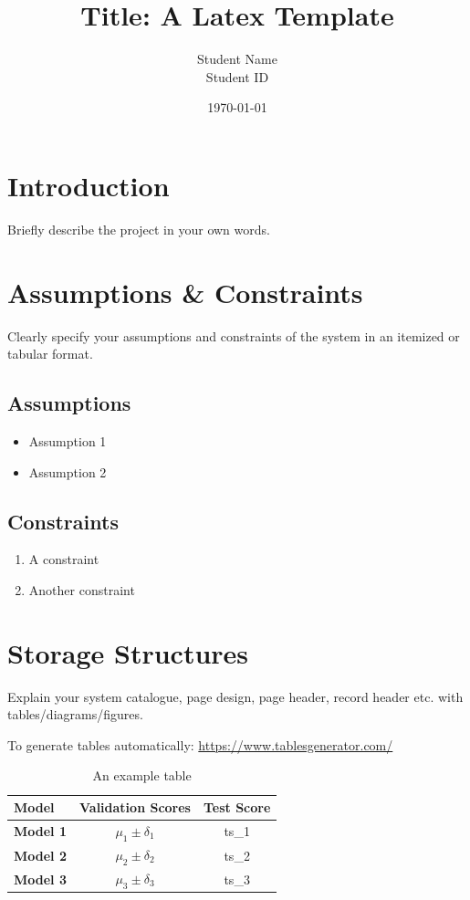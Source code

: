 \documentclass{article}
\title{Title: A Latex Template}
\date{\today}
\author{Student Name \\ Student ID}
\begin{document}
\maketitle
\newpage
\tableofcontents
\newpage
\section{Introduction}
\label{sec:introduction}
Briefly describe the project in your own words. 
\section{Assumptions \& Constraints}
\label{sec:ass-and-const}
Clearly specify your assumptions and constraints of the system in an itemized or tabular format. 
\subsection{Assumptions}
\begin{itemize}
    \item Assumption 1
    \item Assumption 2
\end{itemize}
\subsection{Constraints}
\begin{enumerate}
    \item A constraint
    \item Another constraint
\end{enumerate}

\section{Storage Structures}
\label{sec:structures}
Explain your system catalogue, page design, page header, record header etc. with tables/diagrams/figures. 

To generate tables automatically: \url{https://www.tablesgenerator.com/}

\begin{table}[H]
\centering
\begin{tabular}{|l|c|c|}
\hline
\textbf{Model}   & \multicolumn{1}{l|}{\textbf{Validation Scores}} & \multicolumn{1}{l|}{\textbf{Test Score}} \\ \hline
\textbf{Model 1} & $\mu_1 \pm \delta_1$                   & ts\_1                                    \\ \hline
\textbf{Model 2} & $\mu_2 \pm \delta_2$                   & ts\_2                                    \\ \hline
\textbf{Model 3} & $\mu_3 \pm \delta_3$                   & ts\_3                                    \\ \hline
\end{tabular}
\label{tab:ex}
\caption{An example table}
\end{table}
\end{document}
